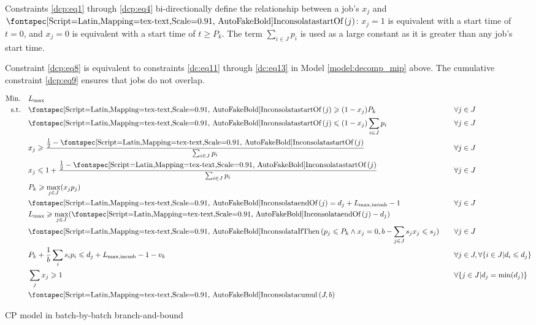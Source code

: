 \documentclass[13pt, letterpaper, oneside]{book}
\begin{document}
Constraints \eqref{dcp:eq1} through \eqref{dcp:eq4} bi-directionally define the
relationship between a job's $x_j$ and $\startOf(j)$: $x_j = 1$ is equivalent
with a start time of $t = 0$, and $x_j = 0$ is equivalent with a start time of
$t \geq P_k$. The term $\sum_{i \in J} p_i$ is used as a large constant as it is
greater than any job's start time.

Constraint \eqref{dcp:eq8} is equivalent to constraints \eqref{dc:eq11} through
\eqref{dc:eq13} in Model \ref{model:decomp_mip} above. The cumulative constraint
\eqref{dcp:eq9} ensures that jobs do not overlap. 

\begin{model}[h!]
\begin{alignat}{2}
\mathrm{Min.} \quad & \Lmax \quad && \\
\mathrm{s.t.} \quad 
& \label{dcp:eq1} \startOf(j) \geq (1-x_j) P_k \quad && \forall j \in J \\
& \startOf(j) \leq (1-x_j) \sum_{i \in J} p_i \quad && \forall j \in J \\
& x_j \geq \frac{ \frac{1}{2} - \startOf(j) }{ \sum_{i \in J} p_i } \quad &&
\forall j \in J \\
& \label{dcp:eq4} x_j \leq 1+\frac{ \frac{1}{2} - \startOf(j)}{\sum_{i \in J} p_i } \quad &&
\forall j \in J \\
& P_k \geq \underset{j \in J}{\max}(x_j p_j) \quad && \\
& \endOf(j) = d_j + L_{\text{max,incmb}} - 1 \quad && \forall j \in J \\
& \Lmax \geq \underset{j \in J}{\max}(\endOf(j) - d_j) \quad &&  \\
& \label{dcp:eq8} \mathtt{IfThen}(p_j \leq P_k \land x_j = 0, b - \sum_{j \in J} s_j
x_j \leq s_j) \quad && \forall j \in J \\
& P_k + \frac{1}{b} \sum_i s_i p_i \leq d_j + L_{\text{max,incmb}} - 1 - v_k
\quad && \forall j \in J, \forall \{i \in J | d_i \leq d_j\} \\
& \sum_j x_j \geq 1 \quad && \forall \{ j \in J | d_j = \min(d_j) \} \\
& \label{dcp:eq9} \mathtt{cumul}(J, b) \quad & &  
\end{alignat}
\caption{CP model in batch-by-batch branch-and-bound}
\label{model:decomp_cp}
\end{model}

\end{document}
